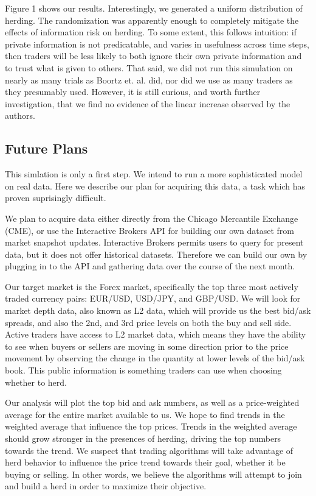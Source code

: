 \documentclass{article}
\begin{document}
Figure 1 shows our results. 
Interestingly, we generated a uniform distribution of herding. 
The randomization was apparently enough to completely mitigate the effects of information risk on herding.
To some extent, this follows intuition: if private information is not predicatable, and varies in usefulness across time steps, then traders will be less likely to both ignore their own private information and to trust what is given to others.
That said, we did not run this simulation on nearly as many trials as Boortz et. al. did, nor did we use as many traders as they presumably used. 
However, it is still curious, and worth further investigation, that we find no evidence of the linear increase observed by the authors.

\subsection{Future Plans}
This simlation is only a first step.
We intend to run a more sophisticated model on real data.
Here we describe our plan for acquiring this data, a task which has proven suprisingly difficult.

We plan to acquire data either directly from the Chicago Mercantile Exchange (CME), or use the Interactive Brokers API for building our own dataset from market snapshot updates.
Interactive Brokers permits users to query for present data, but it does not offer historical datasets. 
Therefore we can build our own by plugging in to the API and gathering data over the course of the next month.

Our target market is the Forex market, specifically the top three most actively traded currency pairs: EUR/USD, USD/JPY, and GBP/USD.
We will look for market depth data, also known as L2 data, which will provide us the best bid/ask spreads, and also the 2nd, and 3rd price levels on both the buy and sell side.
Active traders have access to L2 market data, which means they have the ability to see when buyers or sellers are moving in some direction prior to the price movement by observing the change in the quantity at lower levels of the bid/ask book.
This public information is something traders can use when choosing whether to herd.

Our analysis will plot the top bid and ask numbers, as well as a price-weighted average for the entire market available to us. 
We hope to find trends in the weighted average that influence the top prices. 
Trends in the weighted average should grow stronger in the presences of herding, driving the top numbers towards the trend.
We suspect that trading algorithms will take advantage of herd behavior to influence the price trend towards their goal, whether it be buying or selling.
In other words, we believe the algorithms will attempt to join and build a herd in order to maximize their objective.
\end{document}
